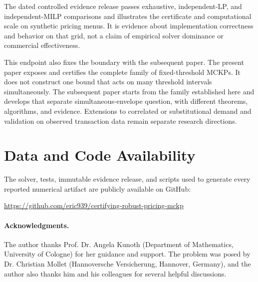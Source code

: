 \documentclass[11pt, a4paper]{article}
\newif\ifblind
\theoremstyle{plain}
\theoremstyle{definition}
\theoremstyle{remark}
\begin{document}
The dated controlled evidence release passes exhaustive, independent-LP, and
independent-MILP comparisons and illustrates the certificate and computational
scale on synthetic pricing menus.  It is evidence about implementation
correctness and behavior on that grid, not a claim of empirical solver
dominance or commercial effectiveness.

This endpoint also fixes the boundary with the subsequent paper.  The present
paper exposes and certifies the complete family of fixed-threshold MCKPs.  It
does not construct one bound that acts on many threshold intervals
simultaneously.  The subsequent paper starts from the family established here
and develops that separate simultaneous-envelope question, with different
theorems, algorithms, and evidence.  Extensions to correlated or substitutional
demand and validation on observed transaction data remain separate research
directions.


\section*{Data and Code Availability}
The solver, tests, immutable evidence release, and scripts used to generate
every reported numerical artifact are publicly available on GitHub:
\ifblind
\begin{center}
\emph{Anonymous artifact link supplied with the review submission.}
\end{center}
\else
\begin{center}
\url{https://github.com/eric939/certifying-robust-pricing-mckp}
\end{center}

\paragraph{Acknowledgments.} The author thanks Prof. Dr. Angela Kunoth (Department of Mathematics, University of Cologne) for her guidance and support. The problem was posed by Dr. Christian Mollet (Hannoversche Versicherung, Hannover, Germany), and the author also thanks him and his colleagues for several helpful discussions.
\fi

\newpage
\end{document}
